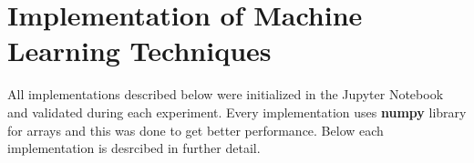 \section{Implementation of Machine Learning Techniques}\label{sec:implmltech}
All implementations described below were initialized in the Jupyter Notebook and validated during each experiment. Every implementation uses \textbf{numpy} \cite{python:numpy} library for arrays and this was done to get better performance. Below each implementation is desrcibed in further detail.





